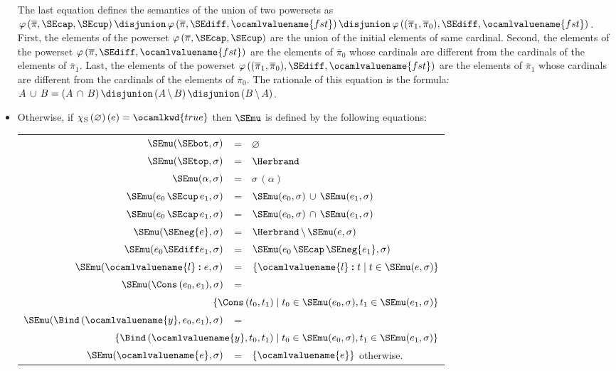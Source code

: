 \begin{itemize}
The last equation defines the semantics of the union of two powersets
as $\varphi \, (\overline{\pi}, \SEcap, \SEcup) \, \disjunion \,
\varphi \, (\overline{\pi}, \SEdiff, \ocamlvaluename{fst}) \,
\disjunion \, \varphi \, ((\overline{\pi}_1, \overline{\pi}_0),
\SEdiff, \ocamlvaluename{fst})$. First, the elements of the powerset
$\varphi \, (\overline{\pi}, \SEcap, \SEcup)$ are the union of the
initial elements of same cardinal. Second, the elements of the
powerset $\varphi \, (\overline{\pi}, \SEdiff, \ocamlvaluename{fst})$
are the elements of $\overline{\pi}_0$ whose cardinals are different
from the cardinals of the elements of $\overline{\pi}_1$. Last, the
elements of the powerset $\varphi \, ((\overline{\pi}_1,
\overline{\pi}_0), \SEdiff, \ocamlvaluename{fst})$ are the elements of
$\overline{\pi}_1$ whose cardinals are different from the cardinals of
the elements of $\overline{\pi}_0$. The rationale of this equation is
the formula: $A \, \cup \, B = (A \, \cap \, B) \, \disjunion
\, (A \, \backslash \, B) \, \disjunion \, (B \, \backslash \, A)$.

  \item 
    Otherwise, if $\chi_{\textnormal{S}} \, (\varnothing) \, (e) =
    \ocamlkwd{true}$ then $\SEmu$ is defined by the following
    equations:

\begin{center}
\begin{supertabular}{rcl} %
$\SEmu(\SEbot,\sigma)$ & = & $\varnothing$ \\
$\SEmu(\SEtop,\sigma)$ & = & $\Herbrand$ \\
$\SEmu(\alpha,\sigma)$    & = & $\sigma \, (\alpha)$ \\
$\SEmu(e_0 \, \SEcup \, e_1, \sigma)$
              & = & $\SEmu(e_0,\sigma) \, \cup \, \SEmu(e_1,\sigma)$ \\
$\SEmu(e_0 \, \SEcap \, e_1,\sigma)$
              & = & $\SEmu(e_0,\sigma) \, \cap \, \SEmu(e_1,\sigma)$ \\
$\SEmu(\SEneg{e},\sigma)$ 
              & = & $\Herbrand \, \backslash \, \SEmu(e,\sigma)$ \\ 
$\SEmu(e_0 \SEdiff e_1, \sigma)$
              & = & $\SEmu(e_0 \, \SEcap \, \SEneg{e_1}, \sigma)$\\
$\SEmu(\ocamlvaluename{l}\/ \pmb{:} e,\sigma)$
              & = & $\{ \ocamlvaluename{l}\/ \pmb{:} t \mid t \in
		    \SEmu(e,\sigma) \}$ \\
$\SEmu(\Cons \, (e_0, e_1),\sigma)$
              & = &\\
\\
$\SEmu(\Bind \, (\ocamlvaluename{y}, e_0, e_1),\sigma)$
              & = &\\
\\
$\SEmu(\ocamlvaluename{e},\sigma)$
              & = & $\{ \ocamlvaluename{e} \}$ otherwise.\\
\end{supertabular}
\end{center}


\end{itemize}
